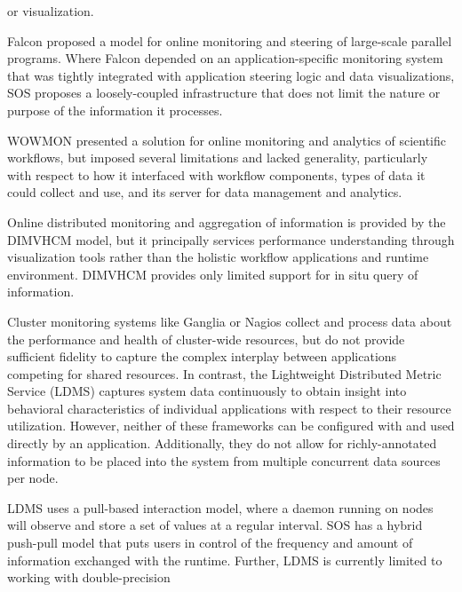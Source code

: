or visualization.
%
\par
%
Falcon \cite{gu1995falcon} proposed a model for online monitoring
and steering of large-scale parallel programs.
%
Where Falcon depended on an application-specific monitoring system
that was tightly integrated with application steering logic and data
visualizations, SOS proposes a loosely-coupled infrastructure that
does not limit the nature or purpose of the information it processes.
%
\par
%
WOWMON \cite{zhang2016wowmon} presented a solution for online
monitoring and analytics of scientific workflows, but imposed several
limitations and lacked generality, particularly with respect to how it
interfaced with workflow components, types of data it could collect
and use, and its server for data management and analytics.
%
\par
%
Online distributed monitoring and aggregation of information is
provided by the DIMVHCM \cite{tesser2012dimvhcm} model, but it
principally services performance understanding through visualization
tools rather than the holistic workflow applications and runtime
environment.
%
DIMVHCM provides only limited support for in situ query of information.
%
\par
%
Cluster monitoring systems like Ganglia \cite{massie2004ganglia} or
Nagios \cite{katsaros2011building} collect and process data about the
performance and health of cluster-wide resources, but do not provide
sufficient fidelity to capture the complex interplay between
applications competing for shared resources.
%
In contrast, the Lightweight Distributed Metric Service
\cite{agelastos2014lightweight} (LDMS) captures system data
continuously to obtain insight into behavioral characteristics of
individual applications with respect to their resource utilization.
%
%
However, neither of these frameworks can be configured with and used
directly by an application.
%
Additionally, they do not allow for richly-annotated information to be
placed into the system from multiple concurrent data sources per node.
%
\par
%
LDMS uses a pull-based interaction model, where a daemon running on
nodes will observe and store a set of values at a regular interval.
%
SOS has a hybrid push-pull model that puts users in control of the
frequency and amount of information exchanged with the runtime.
%
Further, LDMS is currently limited to working with double-precision

